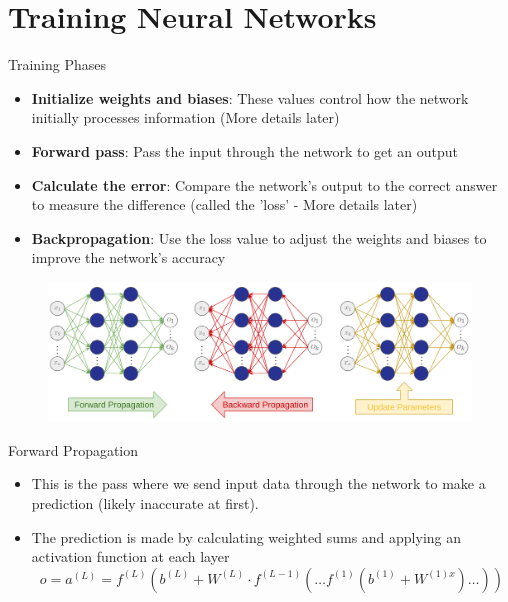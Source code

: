 \documentclass[serif, aspectratio=169]{beamer}
\begin{document}
\section{Training Neural Networks}
\begin{frame}{Training Phases}
    \begin{itemize}
        \item \textbf{Initialize weights and biases}: These values control how the network initially processes information (More details later)
        \item \textbf{Forward pass}: Pass the input through the network to get an output
        \item \textbf{Calculate the error}: Compare the network's output to the correct answer to measure the difference (called the 'loss' - More details later) 
        \item \textbf{Backpropagation}: Use the loss value to adjust the weights and biases to improve the network's accuracy
    \end{itemize}
    \begin{figure}[bh]
            \includegraphics[keepaspectratio, scale=0.2]{pic/4/training-phases.png}
    \end{figure}
\end{frame}

\begin{frame}[t]{Forward Propagation}
    \begin{itemize}
        \item This is the pass where we send input data through the network to make a prediction (likely inaccurate at first).
        \item The prediction is made by calculating weighted sums and applying an activation function at each layer
        $$ o = a^{(L)} = f^{(L)}\left( b^{(L)} + W^{(L)} \cdot f^{(L-1)}\left( \ldots f^{(1)}(b^{(1)} + W^{(1)x})  \ldots \right) \right) $$
    \end{itemize}
\end{frame}
\end{document}
